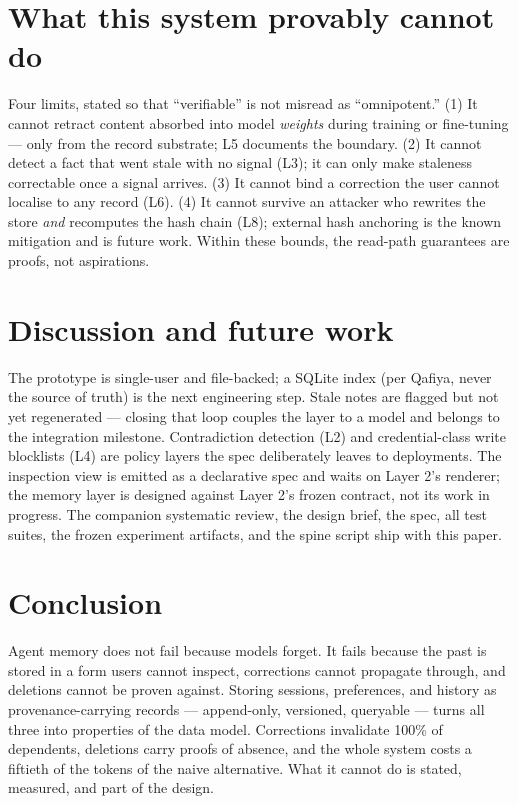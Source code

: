 \documentclass[11pt]{article}
\begin{document}
\section{What this system provably cannot do}
\label{sec:honesty}
Four limits, stated so that ``verifiable'' is not misread as ``omnipotent.'' (1) It cannot retract content absorbed into model \emph{weights} during training or fine-tuning --- only from the record substrate; L5 documents the boundary. (2) It cannot detect a fact that went stale with no signal (L3); it can only make staleness correctable once a signal arrives. (3) It cannot bind a correction the user cannot localise to any record (L6). (4) It cannot survive an attacker who rewrites the store \emph{and} recomputes the hash chain (L8); external hash anchoring is the known mitigation and is future work. Within these bounds, the read-path guarantees are proofs, not aspirations.

\section{Discussion and future work}
The prototype is single-user and file-backed; a SQLite index (per Qafiya, never the source of truth) is the next engineering step. Stale notes are flagged but not yet regenerated --- closing that loop couples the layer to a model and belongs to the integration milestone. Contradiction detection (L2) and credential-class write blocklists (L4) are policy layers the spec deliberately leaves to deployments. The inspection view is emitted as a declarative spec and waits on Layer 2's renderer; the memory layer is designed against Layer 2's frozen contract, not its work in progress. The companion systematic review, the design brief, the spec, all test suites, the frozen experiment artifacts, and the spine script ship with this paper.

\section{Conclusion}
Agent memory does not fail because models forget. It fails because the past is stored in a form users cannot inspect, corrections cannot propagate through, and deletions cannot be proven against. Storing sessions, preferences, and history as provenance-carrying records --- append-only, versioned, queryable --- turns all three into properties of the data model. Corrections invalidate 100\% of dependents, deletions carry proofs of absence, and the whole system costs a fiftieth of the tokens of the naive alternative. What it cannot do is stated, measured, and part of the design.
\end{document}
